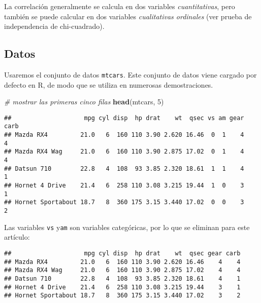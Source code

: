 \documentclass[
]{book}
\newenvironment{Shaded}{\begin{snugshade}}{\end{snugshade}}
\newcommand{\CommentTok}[1]{\textcolor[rgb]{0.56,0.35,0.01}{\textit{#1}}}
\newcommand{\DecValTok}[1]{\textcolor[rgb]{0.00,0.00,0.81}{#1}}
\newcommand{\KeywordTok}[1]{\textcolor[rgb]{0.13,0.29,0.53}{\textbf{#1}}}
\newcommand{\NormalTok}[1]{#1}
\newcommand{\OperatorTok}[1]{\textcolor[rgb]{0.81,0.36,0.00}{\textbf{#1}}}
\newcommand{\StringTok}[1]{\textcolor[rgb]{0.31,0.60,0.02}{#1}}
\begin{document}
La correlación generalmente se calcula en dos variables \emph{cuantitativas}, pero también se puede calcular en dos variables \emph{cualitativas ordinales} (ver prueba de independencia de chi-cuadrado).

\hypertarget{datos}{%
\subsection{Datos}\label{datos}}

Usaremos el conjunto de datos \texttt{mtcars}. Este conjunto de datos viene cargado por defecto en R, de modo que se utiliza en numerosas demostraciones.

\begin{Shaded}
\begin{Highlighting}[]
\CommentTok{# mostrar las primeras cinco filas}
\KeywordTok{head}\NormalTok{(mtcars, }\DecValTok{5}\NormalTok{)}
\end{Highlighting}
\end{Shaded}

\begin{verbatim}
##                    mpg cyl disp  hp drat    wt  qsec vs am gear carb
## Mazda RX4         21.0   6  160 110 3.90 2.620 16.46  0  1    4    4
## Mazda RX4 Wag     21.0   6  160 110 3.90 2.875 17.02  0  1    4    4
## Datsun 710        22.8   4  108  93 3.85 2.320 18.61  1  1    4    1
## Hornet 4 Drive    21.4   6  258 110 3.08 3.215 19.44  1  0    3    1
## Hornet Sportabout 18.7   8  360 175 3.15 3.440 17.02  0  0    3    2
\end{verbatim}

Las variables \texttt{vs} y\texttt{am} son variables categóricas, por lo que se eliminan para este artículo:

\begin{Shaded}
\end{Shaded}

\begin{verbatim}
##                    mpg cyl disp  hp drat    wt  qsec gear carb
## Mazda RX4         21.0   6  160 110 3.90 2.620 16.46    4    4
## Mazda RX4 Wag     21.0   6  160 110 3.90 2.875 17.02    4    4
## Datsun 710        22.8   4  108  93 3.85 2.320 18.61    4    1
## Hornet 4 Drive    21.4   6  258 110 3.08 3.215 19.44    3    1
## Hornet Sportabout 18.7   8  360 175 3.15 3.440 17.02    3    2
\end{verbatim}
\end{document}
